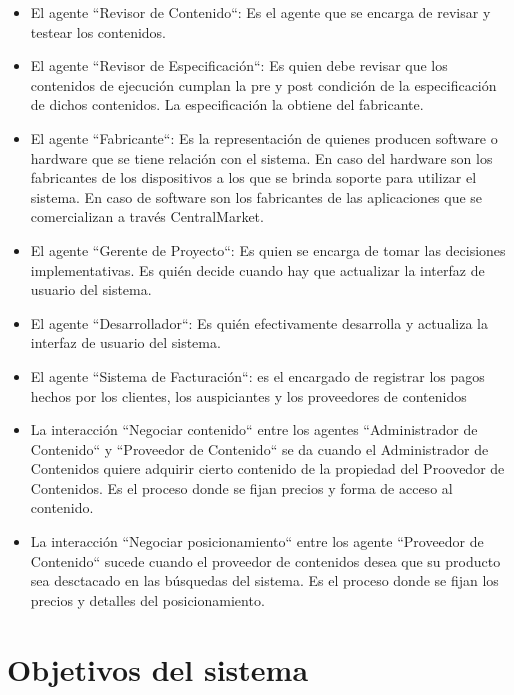 \documentclass[11pt, a4paper, spanish]{article}
\begin{document}
\begin{itemize}
\item El agente ``Revisor de Contenido``: Es el agente que se encarga de revisar y testear los contenidos.

\item El agente ``Revisor de Especificaci\'on``: Es quien debe revisar que los contenidos de ejecuci\'on cumplan la pre y post condici\'on de la especificaci\'on de dichos contenidos.
La especificaci\'on la obtiene del fabricante.

\item El agente ``Fabricante``: Es la representaci\'on de quienes producen software o hardware que se tiene relaci\'on con el sistema. En caso del hardware son los fabricantes de los dispositivos a los que se brinda soporte para utilizar el sistema. En caso de software son los fabricantes de las aplicaciones que se comercializan a trav\'es CentralMarket.

\item El agente ``Gerente de Proyecto``: Es quien se encarga de tomar las decisiones implementativas. Es qui\'en decide cuando hay que actualizar la interfaz de usuario del sistema.

\item El agente ``Desarrollador``: Es qui\'en efectivamente desarrolla y actualiza la interfaz de usuario del sistema.

\item El agente ``Sistema de Facturaci\'on``: es el encargado de registrar los pagos hechos por los clientes, los auspiciantes y los proveedores de contenidos

\item La interacci\'on ``Negociar contenido`` entre los agentes ``Administrador de Contenido`` y ``Proveedor de Contenido`` se da cuando el Administrador de Contenidos quiere adquirir cierto contenido de la propiedad del Proovedor de Contenidos. Es el proceso donde se fijan precios y forma de acceso al contenido.
   
\item La interacci\'on ``Negociar posicionamiento`` entre los agente ``Proveedor de Contenido`` sucede cuando el proveedor de contenidos desea que su producto sea desctacado en las b\'usquedas del sistema. Es el proceso donde se fijan los precios y detalles del posicionamiento.

\end{itemize}

	
\section{Objetivos del sistema}
\end{document}
